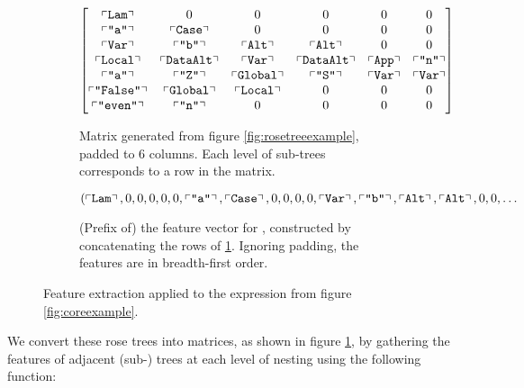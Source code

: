 \begin{figure}
\begin{subfigure}{\textwidth}
    \begin{equation*}
      \begin{bmatrix}
        \left\ulcorner \texttt{Lam} \right\urcorner      & 0                   & 0                  & 0                   & 0               & 0                \\
        \left\ulcorner \texttt{"a"} \right\urcorner     & \left\ulcorner \texttt{Case} \right\urcorner    & 0                  & 0                   & 0               & 0                \\
        \left\ulcorner \texttt{Var} \right\urcorner      & \left\ulcorner \texttt{"b"} \right\urcorner    & \left\ulcorner \texttt{Alt} \right\urcorner    & \left\ulcorner \texttt{Alt} \right\urcorner     & 0               & 0                \\
        \left\ulcorner \texttt{Local} \right\urcorner    & \left\ulcorner \texttt{DataAlt} \right\urcorner & \left\ulcorner \texttt{Var} \right\urcorner    & \left\ulcorner \texttt{DataAlt} \right\urcorner & \left\ulcorner \texttt{App} \right\urcorner & \left\ulcorner \texttt{"n"} \right\urcorner \\
        \left\ulcorner \texttt{"a"} \right\urcorner     & \left\ulcorner \texttt{"Z"} \right\urcorner    & \left\ulcorner \texttt{Global} \right\urcorner & \left\ulcorner \texttt{"S"} \right\urcorner    & \left\ulcorner \texttt{Var} \right\urcorner & \left\ulcorner \texttt{Var} \right\urcorner  \\
        \left\ulcorner \texttt{"False"} \right\urcorner & \left\ulcorner \texttt{Global} \right\urcorner  & \left\ulcorner \texttt{Local} \right\urcorner  & 0                   & 0               & 0                \\
        \left\ulcorner \texttt{"even"} \right\urcorner  & \left\ulcorner \texttt{"n"} \right\urcorner    & 0                  & 0                   & 0               & 0
      \end{bmatrix}
    \end{equation*}
    \caption{Matrix generated from figure \ref{fig:rosetreeexample}, padded to 6 columns. Each level of sub-trees corresponds to a row in the matrix.}
    \label{fig:matrixexample}
  \end{subfigure}
  \vspace{1ex}
  \begin{subfigure}{\textwidth}
    \begin{equation*}
      (\left\ulcorner \texttt{Lam} \right\urcorner, 0, 0, 0, 0, 0, \left\ulcorner \texttt{"a"} \right\urcorner, \left\ulcorner \texttt{Case} \right\urcorner, 0, 0, 0, 0, \left\ulcorner \texttt{Var} \right\urcorner, \left\ulcorner \texttt{"b"} \right\urcorner, \left\ulcorner \texttt{Alt} \right\urcorner, \left\ulcorner \texttt{Alt} \right\urcorner, 0, 0, \dots
     \end{equation*}
     \caption{(Prefix of) the feature vector for , constructed by concatenating the rows of \ref{fig:matrixexample}. Ignoring padding, the features are in breadth-first order.}
     \label{fig:vectorexample}
  \end{subfigure}
  \caption{Feature extraction applied to the expression  from figure \ref{fig:coreexample}.}
\end{figure}

We convert these rose trees into matrices, as shown in figure \ref{fig:matrixexample}, by gathering the features of adjacent (sub-) trees at each level of nesting using the following function:

